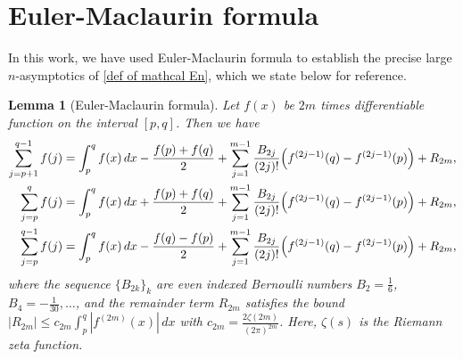 \documentclass[reqno]{amsart}
\newcommand{\1}{\mathds{1}}
\numberwithin{equation}{section}
\newtheorem{lemma}[theorem]{Lemma}
\theoremstyle{definition}
\begin{document}

\section{Euler-Maclaurin formula}
In this work, we have used Euler-Maclaurin formula \cite{BKS2023,AFLS25,ACC2023c} to establish the precise large $n$-asymptotics of \eqref{def of mathcal En}, which we state below for reference.
\begin{lemma}[Euler-Maclaurin formula]\label{lemma:Euler-Maclaurin}
Let $f(x)$ be $2m$ times differentiable function on the interval $[p,q]$. Then we have 
\begin{align}
\begin{split}
\sum_{j=p+1}^{q-1}f(j)&=\int_{p}^{q}f(x)\,dx-\frac{f(p)+f(q)}{2}+\sum_{j=1}^{m-1}\frac{B_{2j}}{(2j)!}\Bigl( 
f^{(2j-1)}(q)-f^{(2j-1)}(p)
\Bigr)
+R_{2m}, 
\\
\sum_{j=p}^{q}f(j)&=\int_{p}^{q}f(x)\,dx+\frac{f(p)+f(q)}{2}+\sum_{j=1}^{m-1}\frac{B_{2j}}{(2j)!}\Bigl( 
f^{(2j-1)}(q)-f^{(2j-1)}(p)
\Bigr)
+R_{2m},
\\
\sum_{j=p}^{q-1}f(j)
&=\int_{p}^{q}f(x)\,dx-\frac{f(q)-f(p)}{2}+\sum_{j=1}^{m-1}\frac{B_{2j}}{(2j)!}\Bigl(f^{(2j-1)}(q)-f^{(2j-1)}(p)\Bigr)+R_{2m}, 
\end{split}    
\end{align}
where the sequence $\{B_{2k}\}_k$ are even indexed Bernoulli numbers $B_{2}=\frac{1}{6}$, $B_4=-\frac{1}{30},\dots$, and the remainder term $R_{2m}$ satisfies the bound $|R_{2m}|\leq c_{2m}\int_{p}^{q}|f^{(2m)}(x)|\,dx$ with $c_{2m}=\frac{2\zeta(2m)}{(2\pi)^{2m}}$. 
Here, $\zeta(s)$ is the Riemann zeta function. 
\end{lemma}
\end{document}
